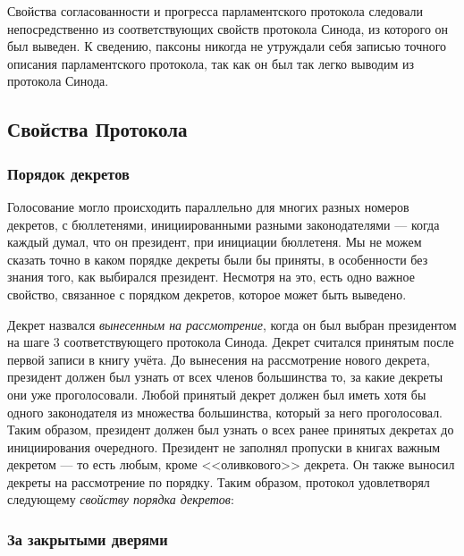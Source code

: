 \documentclass[12pt, a4paper]{article} %
\begin{document}
Свойства согласованности и прогресса парламентского протокола следовали непосредственно из соответствующих свойств протокола Синода, из которого он был выведен. К сведению, паксоны никогда не утруждали себя записью точного описания парламентского протокола, так как он был так легко выводим из протокола Синода.

\subsection{Свойства Протокола}\label{sec:props}
\subsubsection{Порядок декретов}

Голосование могло происходить параллельно для многих разных номеров декретов, с бюллетенями, инициированными разными законодателями --- когда каждый думал, что он президент, при инициации бюллетеня. Мы не можем сказать точно в каком порядке декреты были бы приняты, в особенности без знания того, как выбирался президент. Несмотря на это, есть одно важное свойство, связанное с порядком декретов, которое может быть выведено.

Декрет назвался \textit{вынесенным на рассмотрение}, когда он был выбран президентом на шаге 3 соответствующего протокола Синода. Декрет считался принятым после первой записи в книгу учёта.  До вынесения на рассмотрение нового декрета, президент должен был узнать от всех членов большинства то, за какие декреты они уже проголосовали. Любой принятый декрет должен был иметь хотя бы одного законодателя из множества большинства, который за него проголосовал. Таким образом, президент должен был узнать о всех ранее принятых декретах до инициирования очередного. Президент не заполнял пропуски в книгах важным декретом --- то есть любым, кроме <<оливкового>> декрета. Он также выносил декреты на рассмотрение по порядку. Таким образом, протокол удовлетворял следующему \textit{свойству порядка декретов}:


\subsubsection{За закрытыми дверями}
\end{document}
